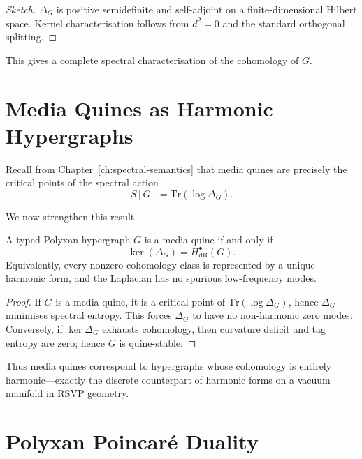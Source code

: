 \begin{proof}[Sketch]
$\Delta_G$ is positive semidefinite and self-adjoint on a finite-dimensional
Hilbert space.  Kernel characterisation follows from $d^2=0$ and the standard
orthogonal splitting.
\end{proof}

This gives a complete spectral characterisation of the cohomology of $G$.

\section{Media Quines as Harmonic Hypergraphs}

Recall from Chapter~\ref{ch:spectral-semantics} that media quines are precisely
the critical points of the spectral action
\[
S[G] = \mathrm{Tr}(\log \Delta_G).
\]

We now strengthen this result.

\begin{theorem}
\label{thm:quines-harmonic}
A typed Polyxan hypergraph $G$ is a media quine if and only if
\[
\ker(\Delta_G) = H^\bullet_{\mathrm{dR}}(G).
\]
Equivalently, every nonzero cohomology class is represented by a unique
harmonic form, and the Laplacian has no spurious low-frequency modes.
\end{theorem}

\begin{proof}
If $G$ is a media quine, it is a critical point of $\mathrm{Tr}(\log \Delta_G)$,
hence $\Delta_G$ minimises spectral entropy.  
This forces $\Delta_G$ to have no non-harmonic zero modes.  
Conversely, if $\ker\Delta_G$ exhausts cohomology, then curvature deficit and
tag entropy are zero; hence $G$ is quine-stable.
\end{proof}

Thus media quines correspond to hypergraphs whose cohomology is entirely
harmonic—exactly the discrete counterpart of harmonic forms on a vacuum
manifold in RSVP geometry.

\section{Polyxan Poincaré Duality}

